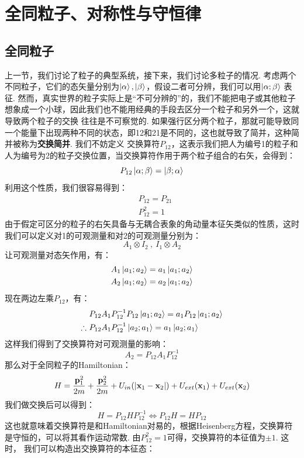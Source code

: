 \chapter{全同粒子、对称性与守恒律}
\section{全同粒子}
上一节，我们讨论了粒子的典型系统，接下来，我们讨论多粒子的情况. 考虑两个不同粒子，它们的态矢量分别为\(\ket{\alpha},\ket{\beta}\)，假设二者可分辨，我们可以用\(\ket{\alpha;\beta}\)
表征. 然而，真实世界的粒子实际上是“不可分辨的”的，我们不能把电子或其他粒子想象成一个小球，因此我们也不能用经典的手段去区分一个粒子和另外一个，这就导致两个粒子的交换
往往是不可察觉的. 如果强行区分两个粒子，那就可能导致同一个能量下出现两种不同的状态，即12和21是不同的，这也就导致了简并，这种简并被称为\textbf{交换简并}. 我们不妨定义
交换算符\(P_{12}\)，这表示我们把人为编号1的粒子和人为编号为2的粒子交换位置，当交换算符作用于两个粒子组合的右矢，会得到：
\[
P_{12}\ket{\alpha;\beta} = \ket{\beta;\alpha}
\]
利用这个性质，我们很容易得到：
\begin{align*}
& P_{12} = P_{21} \\
& P_{12}^{2} = 1 
\end{align*}
由于假定可区分的粒子的右矢具备与无耦合表象的角动量本征矢类似的性质，这时我们可以定义对1的可观测量和对2的可观测量分别为：
\[
A_{1}\otimes I_{2}\ , \ I_{1}\otimes A_{2}
\]
让可观测量对态矢作用，有：
\begin{align*}
& A_{1}\ket{a_{1};a_{2}} = a_{1}\ket{a_{1};a_{2}} \\
& A_{2}\ket{a_{1};a_{2}} = a_{2}\ket{a_{1};a_{2}}
\end{align*}
现在两边左乘\(P_{12}\)，有：
\begin{align*}
& P_{12}A_{1}P_{12}^{-1}P_{12}\ket{a_{1};a_{2}} = a_{1}P_{12}\ket{a_{1};a_{2}} \\
\therefore\ 
& P_{12}A_{1}P_{12}^{-1}\ket{a_{2};a_{1}} = a_{1}\ket{a_{2};a_{1}} \\
\end{align*}
这样我们得到了交换算符对可观测量的影响：
\[
A_{2} = P_{12}A_{1}P_{12}^{-1}
\]
那么对于全同粒子的Hamiltonian：
\[
H = \frac{\mathbf{p}_{1}^{2}}{2m} + \frac{\mathbf{p}_{2}^{2}}{2m} + U_{in}(\abs{\mathbf{x}_{1}-\mathbf{x}_{2}}) + U_{ext}(\mathbf{x}_{1}) + U_{ext}(\mathbf{x}_{2})
\]
我们做交换后可以得到：
\[
H = P_{12}HP_{12}^{-1} \Longleftrightarrow P_{12}H = HP_{12}
\]
这也就意味着交换算符是和Hamiltonian对易的，根据Heisenberg方程，交换算符是守恒的，可以将其看作运动常数. 由\(P_{12}^{2} = 1\)可得，交换算符的本征值为\(\pm1\). 这时，
我们可以构造出交换算符的本征态：
